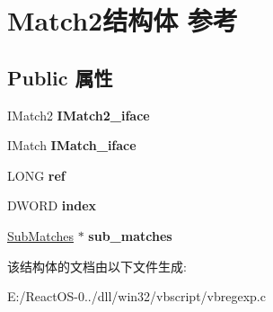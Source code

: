 \hypertarget{struct_match2}{}\section{Match2结构体 参考}
\label{struct_match2}
\subsection*{Public 属性}
\begin{DoxyCompactItemize}
\item 
\mbox{\label{struct_match2_a9dd57a8ba588c1124a1eb969e2565ef3}} 
I\+Match2 {\bfseries I\+Match2\+\_\+iface}
\item 
\mbox{\label{struct_match2_ac8c73f651d6e020256767eadf1ae67e7}} 
I\+Match {\bfseries I\+Match\+\_\+iface}
\item 
\mbox{\label{struct_match2_a897bb6aa5be114d966a9051664aeb2fe}} 
L\+O\+NG {\bfseries ref}
\item 
\mbox{\label{struct_match2_ace3c355690bff126763bc9095970a7f8}} 
D\+W\+O\+RD {\bfseries index}
\item 
\mbox{\label{struct_match2_a05d9db7095ffc7e773f187f649a3277d}} 
\hyperlink{struct_sub_matches}{Sub\+Matches} $\ast$ {\bfseries sub\+\_\+matches}
\end{DoxyCompactItemize}


该结构体的文档由以下文件生成\+:\begin{DoxyCompactItemize}
\item 
E\+:/\+React\+O\+S-\/0../dll/win32/vbscript/vbregexp.\+c\end{DoxyCompactItemize}
